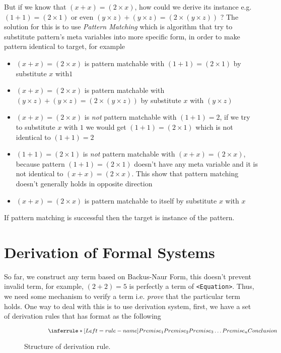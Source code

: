 \documentclass[master.tex]{subfiles}
\begin{document}
But if we know that $(x + x) = (2 \times x)$, how could we derive its instance e.g.
$(1 + 1) = (2 \times 1)$ or even $(y \times z) + (y \times z) = (2 \times (y \times z))$ ?
The solution for this is to use \emph{Pattern Matching} which is algorithm that
try to substitute pattern's meta variables into more specific form, in order to
make pattern identical to target, for example
\begin{itemize}
\item $(x + x) = (2 \times x)$ is pattern matchable with $(1 + 1) = (2 \times 1)$ by
  substitute $x$ with$1$
\item $(x + x) = (2 \times x)$ is pattern matchable with $(y \times z) + (y
  \times z) = (2 \times (y \times z))$ by substitute $x$ with $(y \times z)$
\item $(x + x) = (2 \times x)$ is \emph{not} pattern matchable with $(1 + 1) = 2$, if
  we try to substitute $x$ with $1$ we would get $(1 + 1) = (2 \times 1)$ which is not
  identical to $(1 + 1) = 2$
\item $(1 + 1) = (2 \times 1)$ is \emph{not} pattern matchable with $(x + x) =
  (2 \times x)$, because pattern $(1 + 1) = (2 \times 1)$ doesn't have any meta
  variable and it is not identical to $(x + x) = (2 \times x)$. This show that
  pattern matching doesn't generally holds in opposite direction
\item $(x + x) = (2 \times x)$ is pattern matchable to itself by substitute $x$ with $x$
\end{itemize}

If pattern matching is successful then the target is instance of the pattern.

\section{Derivation of Formal Systems}

So far, we construct any term based on Backus-Naur Form, this doesn't prevent
invalid term, for example, $(2 + 2) = 5$ is perfectly a term of
\texttt{<Equation>}. Thus, we need some mechanism to verify a term i.e.
\emph{prove} that the particular term holds. One way to deal with this is to use
derivation system, first, we have a set of derivation rules that has format as
the following

\begin{figure}[H]
\centering
$$
\qquad \qquad \derivRule{rule-name}{Conclusion}{Premise_1 \\ Premise_2 \\ Premise_3 \\ \ldots \\
  Premise_n}
$$
\caption{Structure of derivation rule.}
\end{figure}
\newpage
\end{document}
